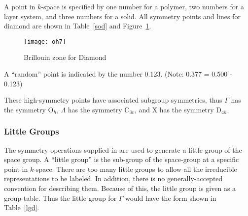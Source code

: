 A point in $k$-space is specified by one number for a polymer, two
numbers for a layer system, and three numbers for a solid.   All symmetry
points and lines for diamond are shown in Table~\ref{sod} and Figure~\ref{oh7}.
\begin{figure}
\begin{makeimage}
\end{makeimage}
\begin{center}
\texttt{[image: oh7]}
\end{center}
\caption{\label{oh7}Brillouin zone for Diamond}
\end{figure}
A ``random'' point is indicated by the number 0.123.  (Note: 0.377 = 0.500 -
0.123)

These high-symmetry points have associated subgroup symmetries, thus $\Gamma $
has the symmetry O$_h$, $\Lambda $ has the symmetry C$_{3v}$, and X has the
symmetry D$_{4h}$.

\subsubsection{Little Groups}
The symmetry operations supplied in  are used to
generate a little group of the space group.  A ``little group'' is the
sub-group of the space-group at a specific point in $k$-space.  There are too
many little groups to allow all the irreducible representations to be labeled.
In addition, there is no generally-accepted convention for describing them.
Because of this, the little group is given as a group-table.  Thus the little
group for $\Gamma$ would have the form shown in Table~\ref{lgd}.

